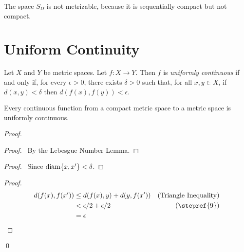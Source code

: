 \begin{example}
    The space $S_\Omega$ is not metrizable, because it is sequentially compact
    but not compact.
\end{example}

\section{Uniform Continuity}

\begin{definition}
    Let $X$ and $Y$ be metric spaces. Let $f : X \rightarrow Y$.
    Then $f$ is \emph{uniformly continuous} if and only if,
    for every $\epsilon > 0$, there exists $\delta > 0$ such that,
    for all $x, y \in X$, if $d(x,y) < \delta$ then
    $d(f(x),f(y)) < \epsilon$.
\end{definition}

\begin{theorem}
    Every continuous function from a compact metric space to a
    metric space is uniformly continuous.
\end{theorem}

\begin{proof}
    \pf
    \begin{proof}
        \pf\ By the Lebesgue Number Lemma.
    \end{proof}
    \begin{proof}
        \pf\ Since $\operatorname{diam} \{x, x'\} < \delta$.
    \end{proof}
    \begin{proof}
        \pf
        \begin{align*}
            d(f(x),f(x')) & \leq d(f(x),y) + d(y,f(x')) & (\text{Triangle Inequality}) \\
            & < \epsilon / 2 + \epsilon / 2 & (\text{\stepref{9}}) \\
            & = \epsilon
        \end{align*}
    \end{proof}
    \qed
\end{proof}

